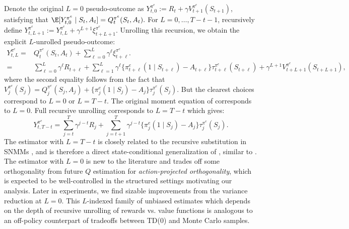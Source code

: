 \documentclass[opre,nonblindrev]{informs4}
\newenvironment{revision}{\begingroup\color{revisionblue}\ignorespaces}{\endgroup}
\begin{document}
\begin{revision}
Denote the original $L=0$ pseudo-outcome as $Y_{t,0}^{\pi^e}
:=
R_t+\gamma V_{t+1}^{\pi^e}(S_{t+1})$, satisfying that $\E[Y_{t,0}^{\pi^e}\mid S_{t},A_t] = Q_t^{\pi^e}(S_t,A_t).$
For $L=0,\ldots,T-t-1$, recursively define $Y_{t,L+1}^{\pi^e}
:=
Y_{t,L}^{\pi^e}
+
\gamma^{L+1}\xi_{t+L+1}^{\pi^e}.$ Unrolling this recursion, we obtain
the explicit $L$-unrolled pseudo-outcome:%
\begin{align}
Y_{t,L}^{\pi^e}
={}&
Q_t^{\pi^e}(S_t,A_t)
+
\sum_{\ell=0}^{L}
\gamma^\ell\xi_{t+\ell}^{\pi^e}.
\label{eq:innovation-representation}\\
=&
\sum_{\ell=0}^{L}\gamma^\ell R_{t+\ell}
+
\sum_{\ell=1}^{L}\gamma^\ell
\{\pi_{t+\ell}^e(1\mid S_{t+\ell})-A_{t+\ell}\}
\tau_{t+\ell}^{\pi^e}(S_{t+\ell})
+
\gamma^{L+1}
V_{t+L+1}^{\pi^e}(S_{t+L+1}),
\label{eq:constructive-unrolling-representation}
\end{align}
where the second equality follows from the fact that $V_j^{\pi^e}(S_j)
=
Q_j^{\pi^e}(S_j,A_j)
+
\{\pi_j^e(1\mid S_j)-A_j\}
\tau_j^{\pi^e}(S_j)$.
But the clearest choices correspond to $L=0$ or $L=T-t$. The original moment equation of  corresponds to $L=0$.
Full recursive unrolling corresponds to $L=T-t$ which  gives:
\begin{equation*} \textstyle 
Y_{t,T-t}^{\pi^e}
=
\sum_{j=t}^{T}\gamma^{j-t}R_j
+
\sum_{j=t+1}^{T}\gamma^{j-t}
\{\pi_j^e(1\mid S_j)-A_j\}
\tau_j^{\pi^e}(S_j).
\end{equation*}
The estimator with $L=T-t$ is closely related to the recursive substitution in SNMMs \citep{robins2004optimal}, and is therefore a direct state-conditional generalization of \citet{lewis2021double}, similar to \citet{ma2025deepblip}. The estimator with $L=0$ is new to the literature and trades off some orthogonality from future $Q$ estimation for \textit{action-projected orthogonality}, which is expected to be well-controlled in the structured settings motivating our analysis. Later in experiments, we find sizable improvements from the variance reduction at $L=0$. 
This $L$-indexed family of unbiased estimates which depends on the depth of recursive unrolling of rewards vs. value functions is analogous to an off-policy counterpart of tradeoffs between TD(0) and Monte Carlo samples. 


\end{revision}
\end{document}
